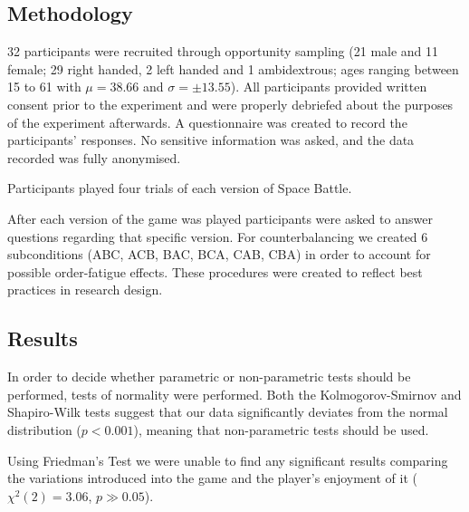 \subsection{Methodology}

32 participants were recruited through opportunity sampling (21 male and 11 female; 29 right handed, 2 left handed and 1 ambidextrous; ages ranging between 15 to 61 with $\mu= 38.66$ and  $\sigma = \pm 13.55$). All participants provided written consent prior to the experiment and were properly debriefed about the purposes of the experiment afterwards. A questionnaire was created to record the participants' responses. No sensitive information was asked, and the data recorded was fully anonymised. 

Participants played four trials of each version of Space Battle.

After each version of the game was played participants were asked to answer questions regarding that specific version. For counterbalancing we created 6 subconditions (ABC, ACB, BAC, BCA, CAB, CBA) in order to account for possible order-fatigue effects. These procedures were created to reflect best practices in research design.


\subsection{Results}

In order to decide whether parametric or non-parametric tests should be performed, tests of normality were performed. Both the Kolmogorov-Smirnov and Shapiro-Wilk tests suggest that our data significantly deviates from the normal distribution ($p < 0.001$), meaning that non-parametric tests should be used.

Using Friedman's Test we were unable to find any significant results comparing the variations introduced into the game and the player's enjoyment of it ($\chi^2(2) = 3.06$, $p \gg 0.05$).